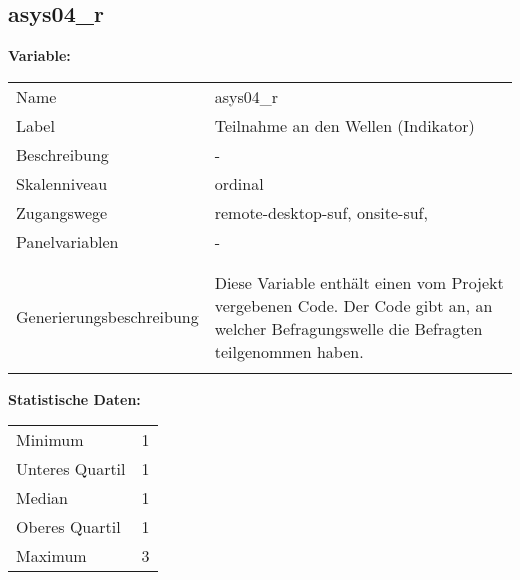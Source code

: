 	
	
	\subsection{asys04\_r}
	\label{subSection:asys04_r}

	\noindent\textbf{Variable:}\\
		\begin{tabular}{lL{11.3cm}}
			\label{tableVariable:asys04_r}
			Name & asys04\_r \\
			Label & Teilnahme an den Wellen (Indikator) \\
			Beschreibung & - \\
			Skalenniveau & ordinal \\
			Zugangswege &
				remote-desktop-suf,
				onsite-suf,
 \\
			Panelvariablen & -
			 \\
			 \\
 \\
					Generierungsbeschreibung & Diese Variable enthält einen vom Projekt vergebenen Code. Der Code gibt an, an welcher Befragungswelle die Befragten teilgenommen haben. 
				 \\	
			 \\
		\end{tabular}



		\vspace*{1 cm}
		\noindent\textbf{Statistische Daten:}\\
			\begin{tabular}{ll}
				\label{tableStatistics:asys04_r}
					Minimum & 1 \\
					Unteres Quartil & 1 \\
					Median & 1 \\
					Oberes Quartil & 1 \\
					Maximum & 3 \\
			\end{tabular}



